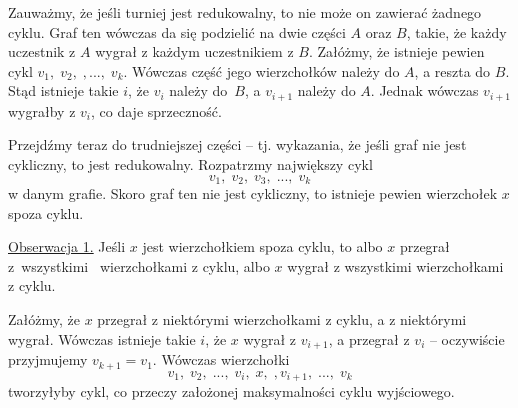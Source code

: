 \vspace{5px}


\noindent
Zauważmy, że jeśli turniej jest redukowalny, to nie może on zawierać żadnego cyklu. Graf ten wówczas da się podzielić na dwie części $A$ oraz $B$, takie, że każdy uczestnik z $A$ wygrał z każdym uczestnikiem z $B$. Załóżmy, że istnieje pewien cykl $v_1, \; v_2, \;, ..., \; v_k$. Wówczas część jego wierzchołków należy do $A$, a reszta do $B$. Stąd istnieje takie $i$, że $v_i$ należy do~$B$, a $v_{i + 1}$ należy do $A$. Jednak wówczas $v_{i + 1}$ wygrałby z $v_i$, co daje sprzeczność.

\vspace{10px}
\noindent
Przejdźmy teraz do trudniejszej części -- tj. wykazania, że jeśli graf nie jest cykliczny, to jest redukowalny. Rozpatrzmy największy cykl
\[
	v_1, \; v_{2}, \; v_{3}, \; ..., \; v_k
\]
w danym grafie. Skoro graf ten nie jest cykliczny, to istnieje pewien wierzchołek $x$ spoza cyklu.

\vspace{10px}
\noindent
\underline{Obserwacja 1.} Jeśli $x$ jest wierzchołkiem spoza cyklu, to albo $x$ przegrał z~wszystkimi \phantom{Obserwacja 1.  }~wierzchołkami z cyklu, albo $x$ wygrał z wszystkimi wierzchołkami z cyklu.

\begin{center}
\end{center}

\vspace{10px}
\noindent
Załóżmy, że $x$ przegrał z niektórymi wierzchołkami z cyklu, a z niektórymi wygrał. Wówczas istnieje takie $i$, że $x$ wygrał z $v_{i + 1}$, a przegrał z $v_{i}$ -- oczywiście przyjmujemy $v_{k + 1} = v_{1}$. Wówczas wierzchołki
\[
	v_1, \; v_{2}, \; ..., \; v_i, \; x, \;, v_{i + 1}, \; ..., \; v_k
\]
tworzyłyby cykl, co przeczy założonej maksymalności cyklu wyjściowego.



